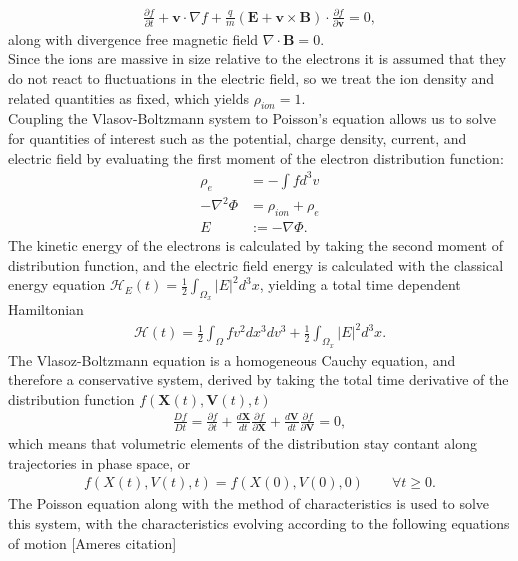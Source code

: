 \documentclass{article}
\begin{document}
\begin{align*}
\frac{\partial f}{\partial t} + \textbf{v}\cdot \nabla f + \frac{q}{m}(\textbf{E} + \textbf{v}\times \textbf{B})\cdot \frac{\partial f}{\partial \textbf{v}}=0,
\end{align*}
along with divergence free magnetic field $\nabla \cdot$\textbf{B}$= 0$.\\
Since the ions are massive in size relative to the electrons it is assumed that they do not react to fluctuations in the electric field, so we treat the ion density and related quantities as fixed, which yields $\rho_{ion} = 1$.\\
\vspace{0.01cm}
Coupling the Vlasov-Boltzmann system to Poisson's equation allows us to solve for quantities of interest such as the potential, charge density, current, and electric field by evaluating the first moment of the electron distribution function: 
\begin{align*}
\rho_{e} &= -\int f d^3v\\
-\nabla^2 \Phi &= \rho_{ion} + \rho_{e}\\
E&:= - \nabla \Phi.
\end{align*}
The kinetic energy of the electrons is calculated by taking the second moment of distribution function, and the electric field energy is calculated with the classical energy equation $\mathcal{H}_E(t) = \frac{1}{2}\int_{\Omega_x} |E|^2 d^3x$, yielding a total time dependent  Hamiltonian
\begin{align*}
\mathcal{H}(t) = \frac{1}{2}\int_{\Omega} f v^2 dx^3dv^3 +  \frac{1}{2}\int_{\Omega_x} |E|^2 d^3x.
\end{align*}
The Vlasoz-Boltzmann equation is a homogeneous Cauchy equation, and therefore a conservative system, derived by taking the total time derivative of the distribution function $f(\textbf{X}(t),\textbf{V}(t),t)$
\begin{align*}
\frac{D f}{Dt} = \frac{\partial f}{\partial t} + \frac{d \textbf{X}}{dt}\frac{\partial f}{\partial \textbf{X}} + \frac{d\textbf{V}}{d t} \frac{\partial f}{\partial \textbf{V}} =0,
\end{align*}
which means that volumetric elements of the distribution stay contant along trajectories in phase space, or
\begin{align*}
f(X(t), V(t), t) =  f(X(0), V(0), 0) \qquad \forall t\ge 0.
\end{align*}
The Poisson equation along with the method of characteristics is used to solve this system, with the characteristics evolving according to the following equations of motion [Ameres citation]
\end{document}
